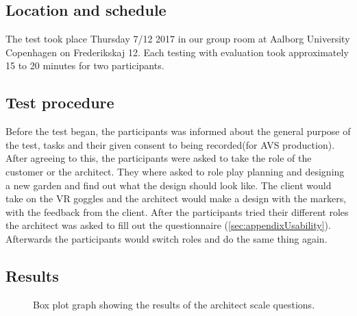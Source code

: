 \subsection*{Location and schedule}
The test took place Thursday 7/12 2017 in our group room at Aalborg University Copenhagen on Frederikskaj 12. Each testing with evaluation took approximately 15 to 20 minutes for two participants.

\subsection*{Test procedure}
Before the test began, the participants was informed about the general purpose of the test, tasks and their given consent to being recorded(for AVS production). After agreeing to this, the participants were asked to take the role of the customer or the architect. They where asked to role play planning and designing a new garden and find out what the design should look like. The client would take on the VR goggles and the architect would make a design with the markers, with the feedback from the client. After the participants tried their different roles the architect was asked to fill out the questionnaire (\ref{sec:appendixUsability}). Afterwards the participants would switch roles and do the same thing again.
\subsection{Results}

\begin{figure}[H]
	\centering
	\caption{Box plot graph showing the results of the architect scale questions.}
	\label{fig:boxPlotResults2}
\end{figure}

